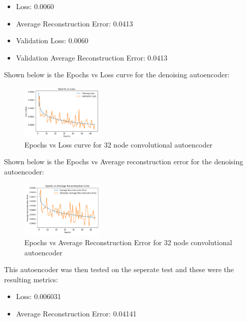 \documentclass[conference]{IEEEtran}
\begin{document}
    \begin{itemize}
        \item Loss: 0.0060
        \item Average Reconstruction Error: 0.0413
        \item Validation Loss: 0.0060 
        \item Validation Average Reconstruction Error: 0.0413
    \end{itemize}

    Shown below is the Epochs vs Loss curve for the denoising autoencoder:

    \begin{figure}[H]
        \centering
        \captionsetup{justification=centering}
        \centering
            \includegraphics[width=0.35\textwidth]{27.png}
            \caption{Epochs vs Loss curve for 32 node convolutional autoencoder}
    \end{figure}

    Shown below is the Epochs vs Average reconstruction error for the denoising autoencoder:

    \begin{figure}[H]
        \centering
        \captionsetup{justification=centering}
        \centering
            \includegraphics[width=0.35\textwidth]{28.png}
            \caption{Epochs vs Average Reconstruction Error for 32 node convolutional autoencoder}
    \end{figure}

    This autoencoder was then tested on the seperate test and these were the resulting metrics:

    \begin{itemize}
        \item Loss: 0.006031
        \item Average Reconstruction Error: 0.04141\\
    \end{itemize}
\end{document}
